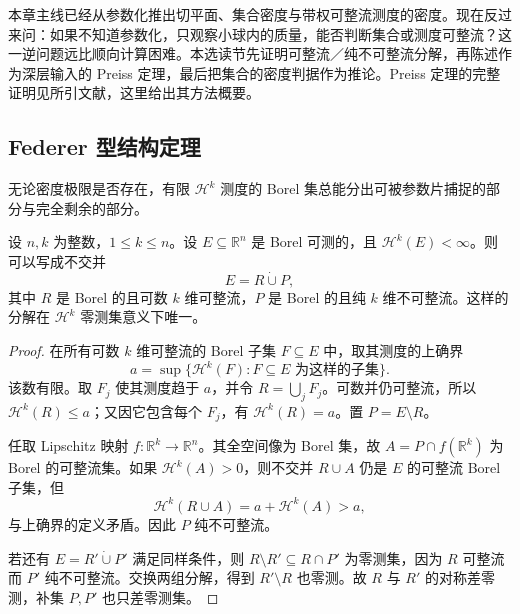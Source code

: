 
本章主线已经从参数化推出切平面、集合密度与带权可整流测度的密度。现在反过来问：如果不知道参数化，只观察小球内的质量，能否判断集合或测度可整流？这一逆问题远比顺向计算困难。本选读节先证明可整流／纯不可整流分解，再陈述作为深层输入的 Preiss 定理，最后把集合的密度判据作为推论。Preiss 定理的完整证明见所引文献，这里给出其方法概要。


\subsection{Federer 型结构定理}
\label{b1:subsec:190403}

无论密度极限是否存在，有限 \(\mathcal H^k\) 测度的 Borel 集总能分出可被参数片捕捉的部分与完全剩余的部分。

\begin{theorem}[可整流与纯不可整流分解]\label{b1:thm:rectifiable-pure-decomposition}
设 \(n,k\) 为整数，\(1\leq k\leq n\)。设 \(E\subseteq\mathbb R^n\) 是 Borel 可测的，且 \(\mathcal H^k(E)<\infty\)。则可以写成不交并
\[
 E=R\mathbin{\dot\cup}P,
\]
其中 \(R\) 是 Borel 的且可数 \(k\) 维可整流，\(P\) 是 Borel 的且纯 \(k\) 维不可整流。这样的分解在 \(\mathcal H^k\) 零测集意义下唯一。
\end{theorem}
\begin{proof}
在所有可数 \(k\) 维可整流的 Borel 子集 \(F\subseteq E\) 中，取其测度的上确界
\[
 a=\sup\{\mathcal H^k(F):F\subseteq E\text{ 为这样的子集}\}.
\]
该数有限。取 \(F_j\) 使其测度趋于 \(a\)，并令 \(R=\bigcup_jF_j\)。可数并仍可整流，所以 \(\mathcal H^k(R)\leq a\)；又因它包含每个 \(F_j\)，有 \(\mathcal H^k(R)=a\)。置 \(P=E\setminus R\)。

任取 Lipschitz 映射 \(f:\mathbb R^k\to\mathbb R^n\)。其全空间像为 Borel 集，故 \(A=P\cap f(\mathbb R^k)\) 为 Borel 的可整流集。如果 \(\mathcal H^k(A)>0\)，则不交并 \(R\cup A\) 仍是 \(E\) 的可整流 Borel 子集，但
\[
 \mathcal H^k(R\cup A)=a+\mathcal H^k(A)>a,
\]
与上确界的定义矛盾。因此 \(P\) 纯不可整流。

若还有 \(E=R'\mathbin{\dot\cup}P'\) 满足同样条件，则 \(R\setminus R'\subseteq R\cap P'\) 为零测集，因为 \(R\) 可整流而 \(P'\) 纯不可整流。交换两组分解，得到 \(R'\setminus R\) 也零测。故 \(R\) 与 \(R'\) 的对称差零测，补集 \(P,P'\) 也只差零测集。
\end{proof}

